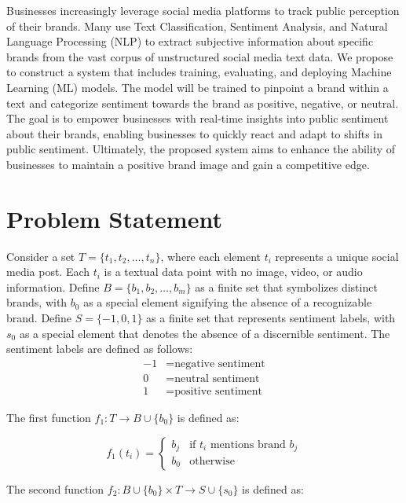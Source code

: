 \documentclass{article}
\begin{document}
Businesses increasingly leverage social media platforms to track public
perception of their brands. Many use Text Classification, Sentiment Analysis,
and Natural Language Processing (NLP) to extract subjective information about
specific brands from the vast corpus of unstructured social media text data. We
propose to construct a system that includes training, evaluating, and deploying
Machine Learning (ML) models. The model will be trained to pinpoint a brand
within a text and categorize sentiment towards the brand as positive, negative,
or neutral. The goal is to empower businesses with real-time insights into
public sentiment about their brands, enabling businesses to quickly react and
adapt to shifts in public sentiment. Ultimately, the proposed system aims to
enhance the ability of businesses to maintain a positive brand image and gain a
competitive edge.

\section{Problem Statement}

Consider a set $T = \{t_1, t_2, \ldots, t_n\}$, where each element $t_i$
represents a unique social media post. Each $t_i$ is a textual data point with
no image, video, or audio information. Define $B = \{b_1, b_2, \ldots, b_m\}$
as a finite set that symbolizes distinct brands, with $b_0$ as a special
element signifying the absence of a recognizable brand. Define $S = \{-1, 0,
    1\}$ as a finite set that represents sentiment labels, with $s_0$ as a special
element that denotes the absence of a discernible sentiment. The sentiment
labels are defined as follows:
\begin{align*}
    -1 & = \text{negative sentiment} \\
    0  & = \text{neutral sentiment}  \\
    1  & = \text{positive sentiment}
\end{align*}

The first function $f_1: T \rightarrow B \cup \{b_0\}$ is defined as:

\[
    f_1(t_i) =
    \begin{cases}
        b_j & \text{if } t_i \text{ mentions brand } b_j \\
        b_0 & \text{otherwise}
    \end{cases}
\]

The second function $f_2: B \cup \{b_0\} \times T \rightarrow S \cup \{s_0\}$
is defined as:
\end{document}
